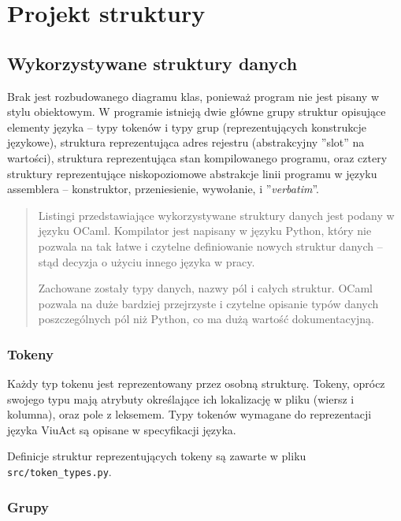 \section{Projekt struktury}

\subsection{Wykorzystywane struktury danych}

Brak jest rozbudowanego diagramu klas, ponieważ program nie jest pisany w stylu obiektowym.
W programie istnieją dwie główne grupy struktur opisujące elementy języka -- typy tokenów i typy grup
(reprezentujących konstrukcje językowe), struktura reprezentująca adres rejestru (abstrakcyjny ''slot'' na
wartości), struktura reprezentująca stan kompilowanego programu, oraz cztery struktury reprezentujące
niskopoziomowe abstrakcje linii programu w języku assemblera -- konstruktor, przeniesienie, wywołanie, i
''\emph{verbatim}''.

\begin{quote}
    Listingi przedstawiające wykorzystywane struktury danych jest podany w języku OCaml.
    Kompilator jest napisany w języku Python, który nie pozwala na tak łatwe i czytelne definiowanie
    nowych struktur danych -- stąd decyzja o użyciu innego języka w pracy.

    Zachowane zostały typy danych, nazwy pól i całych struktur. OCaml pozwala na duże bardziej
    przejrzyste i czytelne opisanie typów danych poszczególnych pól niż Python, co ma dużą
    wartość dokumentacyjną.
\end{quote}

\subsubsection{Tokeny}
\label{diagram_klas_tokeny}

Każdy typ tokenu jest reprezentowany przez osobną strukturę. Tokeny, oprócz swojego typu mają atrybuty
określające ich lokalizację w pliku (wiersz i kolumna), oraz pole z leksemem. Typy tokenów wymagane do
reprezentacji języka ViuAct są opisane w specyfikacji języka.

Definicje struktur reprezentujących tokeny są zawarte w pliku \texttt{src/token\_types.py}.

\subsubsection{Grupy}
\label{diagram_klas_grupy}

